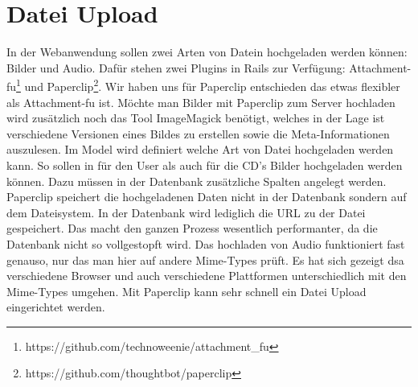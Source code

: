 \section{Datei Upload}
In der Webanwendung sollen zwei Arten von Datein hochgeladen werden können: Bilder und Audio. Dafür stehen zwei Plugins in Rails zur Verfügung: Attachment-fu\footnote{https://github.com/technoweenie/attachment_fu} und Paperclip\footnote{https://github.com/thoughtbot/paperclip}. Wir haben uns für Paperclip entschieden das etwas flexibler als Attachment-fu ist. Möchte man Bilder mit Paperclip zum Server hochladen wird zusätzlich noch das Tool ImageMagick benötigt, welches in der Lage ist verschiedene Versionen eines Bildes zu erstellen sowie die Meta-Informationen auszulesen. Im Model wird definiert welche Art von Datei hochgeladen werden kann. So sollen in für den User als auch für die CD's Bilder hochgeladen werden können. Dazu müssen in der Datenbank zusätzliche Spalten angelegt werden. Paperclip speichert die hochgeladenen Daten nicht in der Datenbank sondern auf dem Dateisystem. In der Datenbank wird lediglich die URL zu der Datei gespeichert. Das macht den ganzen Prozess wesentlich performanter, da die Datenbank nicht so vollgestopft wird. Das hochladen von Audio funktioniert fast genauso, nur das man hier auf andere Mime-Types prüft. Es hat sich gezeigt dsa verschiedene Browser und auch verschiedene Plattformen unterschiedlich mit den Mime-Types umgehen. Mit Paperclip kann sehr schnell ein Datei Upload eingerichtet werden.